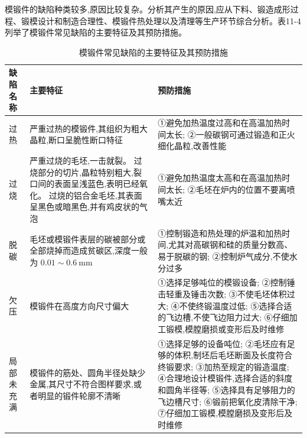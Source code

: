 \documentclass[UTF8]{ctexbook}
\newcommand{\◎}{\ensuremath{\bigcirc}}
\begin{document}
模锻件的缺陷种类较多,原因比较复杂。分析其产生的原因,应从下料、锻造成形过程、锻模设计和制造合理性、模锻件热处理以及清理等生产环节综合分析。表11-4列举了模锻件常见缺陷的主要特征及其预防措施。

\begin{longtable}[H]{|l|p{5cm}|p{7cm}|}
\caption{模锻件常见缺陷的主要特征及其预防措施}\\
\hline
缺陷名称 & 主要特征 & 预防措施 \\
\hline
过热 & 严重过热的模锻件,其组织为粗大晶粒,断口呈脆性断口特征 & ①避免加热温度过高和在高温加热时间太长; \newline ②一般碳钢可通过锻造和正火细化晶粒,改善性能 \\
\hline
过烧 & 严重过烧的毛坯,一击就裂。 \newline 过烧部分的切片,晶粒特别粗大,裂口间的表面呈浅蓝色,表明已经氧化。 \newline 过烧的铝合金毛坯,其表面呈黑色或暗黑色,并有鸡皮状的气泡 & ①避免加热温度太高和在高温加热时间太长; \newline ②毛坯在炉内的位置不要离喷嘴太近 \\
\hline
脱碳 & 毛坯或模锻件表层的碳被部分或全部烧掉而造成贫碳区,深度一般为 $0.01 \sim 0.6 \mathrm{~mm}$ & ①控制锻造和热处理的炉温和加热时间,尤其对高碳钢和硅的质量分数高、易于脱碳的钢; \newline ②控制炉气成分,不使水分过多 \\
\hline
欠压 & 模锻件在高度方向尺寸偏大 & ①选择足够吨位的模锻设备; \newline ②控制锤击轻重及锤击次数; \newline ③不使毛坯体积过大; \newline ④不使终锻温度过低; \newline ⑤选择合适的飞边槽,不使飞边阻力过大; \newline ⑥仔细加工锻模,模膛磨损或变形后及时维修 \\
\hline
局部未充满 & 模锻件的筋处、圆角半径处缺少金属,其尺寸不符合图样要求,或者明显的锻件轮廓不清晰 & ①选择足够的设备吨位; \newline ②毛坯应有足够的体积,制坯后毛坯断面及长度符合终锻要求; \newline ③加热至规定的锻造温度; \newline ④合理地设计模锻件,选择合适的斜度和圆角半径等; \newline ⑤选择具有足够阻力的飞边槽尺寸; \newline ⑥锻前把氧化皮清除干净; \newline ⑦仔细加工锻模,模膛磨损及变形后及时维修 \\

\end{longtable}
\end{document}
